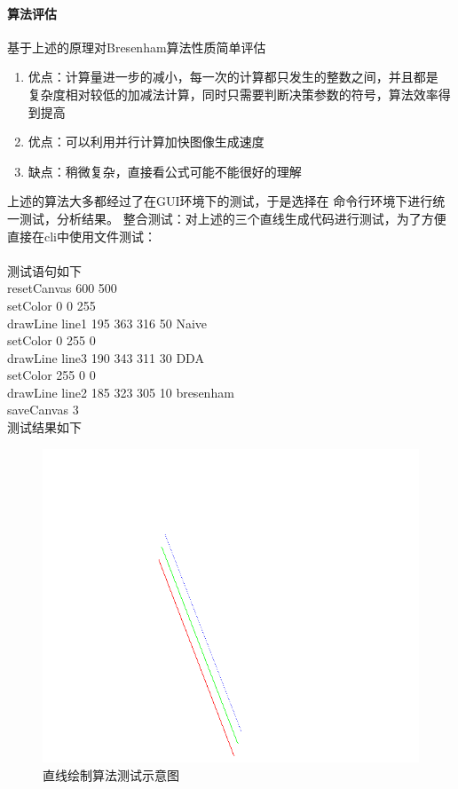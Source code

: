 \documentclass[a4paper,UTF8]{article}
\theoremstyle{definition}
\begin{document}
\paragraph{算法评估} 
基于上述的原理对Bresenham算法性质简单评估
\begin{enumerate}
    \item 优点：计算量进一步的减小，每一次的计算都只发生的整数之间，并且都是
    复杂度相对较低的加减法计算，同时只需要判断决策参数的符号，算法效率得到提高
    \item 优点：可以利用并行计算加快图像生成速度
    \item 缺点：稍微复杂，直接看公式可能不能很好的理解
\end{enumerate}

上述的算法大多都经过了在GUI环境下的测试，于是选择在
命令行环境下进行统一测试，分析结果。
整合测试：对上述的三个直线生成代码进行测试，为了方便直接在cli中使用文件测试：\\\\
测试语句如下\\
\indent resetCanvas 600 500\\
\indent setColor 0 0 255\\
\indent drawLine line1 195 363 316 50 Naive\\
\indent setColor 0 255 0\\
\indent drawLine line3 190 343 311 30 DDA\\
\indent setColor 255 0 0\\
\indent drawLine line2 185 323 305 10 bresenham\\
\indent saveCanvas 3\\

测试结果如下\\
\begin{figure}[h]
	\centering
	\includegraphics[scale=0.6]{figure/linetest.png}
	\caption{直线绘制算法测试示意图}
	\label{fig:line}
\end{figure}
\end{document}
